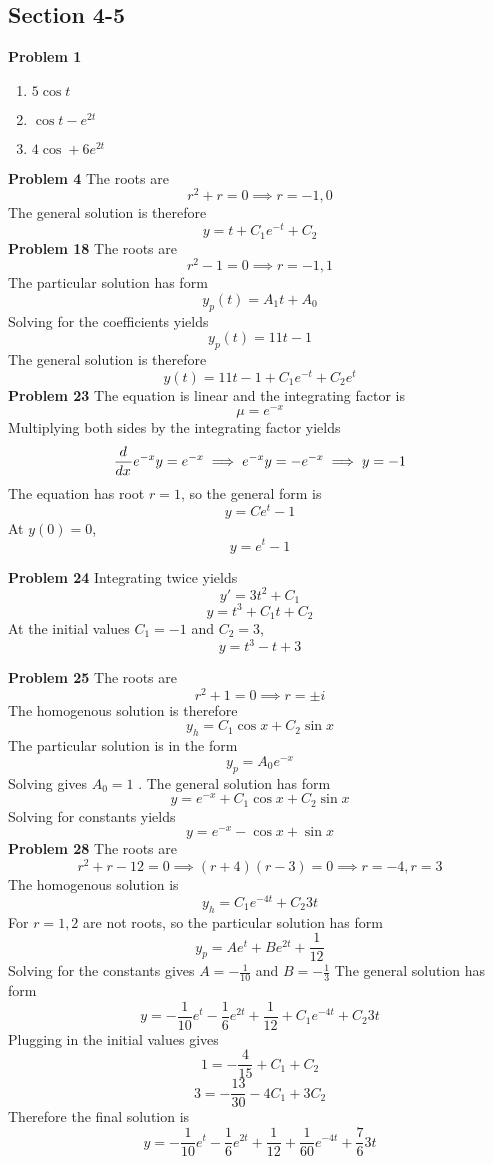 \subsection*{Section 4-5}
\textbf{Problem 1}
\begin{enumerate}
    \item $5\cos t$
    \item $\cos t - e^{2t}$
    \item $4\cos +6e^{2t}$
\end{enumerate}
\textbf{Problem 4}
The roots are 
\[
    r^2 + r = 0 \implies r = -1, 0
\]
The general solution is therefore 
\[
    y = t + C_1e^{-t} + C_2
\]
\textbf{Problem 18}
The roots are 
\[
    r^2-1 = 0 \implies r=-1, 1
\]
The particular solution has form 
\[
    y_p(t) = A_1t + A_0
\]
Solving for the coefficients yields 
\[
    y_p(t) = 11t - 1
\]
The general solution is therefore
\[
    y(t) = 11t-1 + C_1e^{-t} + C_2e^t
\]
\textbf{Problem 23}
The equation is linear and the integrating factor is 
\[
    \mu = e^{-x}
\]
Multiplying both sides by the integrating factor yields 
\[
   \frac{d^{} }{d x^{}} e^{-x}y = e^{-x}
   \implies e^{-x}y = -e^{-x}
   \implies y = -1
\]
The equation has root $r=1$, so the general form is 
\[
    y = Ce^t-1
\]
At $y(0) = 0$,
\[
    y = e^t-1
\]

\textbf{Problem 24}
Integrating twice yields 
\[
    y' = 3t^2 + C_1
\]
\[
    y = t^3 + C_1t + C_2
\]
At the initial values $C_1 = -1$ and $C_2 = 3$, 
\[
    y = t^3 - t + 3
\]

\textbf{Problem 25}
The roots are 
\[
    r^2 + 1 = 0 \implies r = \pm i
\]
The homogenous solution is therefore 
\[
    y_h = C_1\cos x + C_2\sin x
\]
The particular solution is in the form 
\[
    y_p = A_0e^{-x}
\]
Solving gives $A_0 = 1$ .
The general solution has form 
\[
    y = e^{-x} + C_1\cos x + C_2\sin x
\]
Solving for constants yields 
\[
    y = e^{-x} - \cos x + \sin x
\]
\textbf{Problem 28}
The roots are 
\[
    r^2 + r - 12 = 0 
    \implies (r+4)(r-3) = 0
    \implies r=-4, r=3
\]
The homogenous solution is 
\[
    y_h = C_1e^{-4t} + C_2{3t}
\]
For $r=1,2$ are not roots, so the particular solution has form 
\[
    y_p = Ae^t + Be^{2t} + \frac{1}{12}
\]
Solving for the constants gives $A=-\frac{1}{10}$ and $B=-\frac{1}{3}$
The general solution has form 
\[
    y = -\frac{1}{10}e^t - \frac{1}{6}e^{2t} + \frac{1}{12} + C_1e^{-4t} + C_2{3t}
\]
Plugging in the initial values gives 
\[
    1 = -\frac{4}{15} + C_1 + C_2
\]
\[
    3 = -\frac{13}{30} -4C_1 + 3C_2
\]
Therefore the final solution is 
\[
    y = -\frac{1}{10}e^t - \frac{1}{6}e^{2t} + \frac{1}{12} + \frac{1}{60}e^{-4t} + \frac{7}{6}{3t}
\]